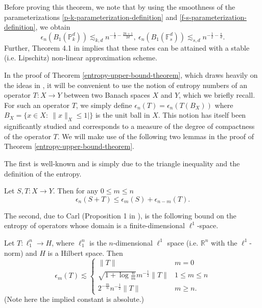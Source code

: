Before proving this theorem, we note that by using the smoothness of the parameterizations \eqref{p-k-parameterization-definition} and \eqref{f-s-parameterization-definition}, we obtain
\begin{equation}
 \epsilon_n(B_1(\mathbb{P}_k^d)) \lesssim_{k,d} n^{-\frac{1}{2} - \frac{2k+1}{2d}},~\epsilon_n(B_1(\mathbb{F}_s^d)) \lesssim_{s,d} n^{-\frac{1}{2} - \frac{s}{d}}.
\end{equation}
Further, Theorem 4.1 in \cite{cohen2020optimal} implies that these rates can be attained with a stable (i.e. Lipschitz) non-linear approximation scheme.

In the proof of Theorem \ref{entropy-upper-bound-theorem}, which draws heavily on the ideas in \cite{ball1990entropy}, it will be convenient to use the notion of entropy numbers of an operator $T:X\rightarrow Y$ between two Banach spaces $X$ and $Y$, which we briefly recall.  For such an operator $T$, we simply define $\epsilon_n(T) = \epsilon_n(T(B_X))$ where $B_X = \{x\in X:~\|x\|_X\leq 1|\}$ is the unit ball in $X$. This notion has itself been significantly studied and corresponds to a measure of the degree of compactness of the operator $T$. We will make use of the following two lemmas in the proof of Theorem \ref{entropy-upper-bound-theorem}.

The first is well-known and is simply due to the triangle inequality and the definition of the entropy.
\begin{lemma}\label{triangle-inequality-entropy-lemma}
 Let $S,T:X\rightarrow Y$. Then for any $0 \leq m\leq n$
 \begin{equation}
  \epsilon_n(S+T) \leq \epsilon_m(S) + \epsilon_{n-m}(T).
 \end{equation}

\end{lemma}

The second, due to Carl (Proposition 1 in \cite{carl1985inequalities}), is the following bound on the entropy of operators whose domain is a finite-dimensional $\ell^1$-space.
\begin{lemma}\label{carls-lemma}
 Let $T:\ell_1^n\rightarrow H$, where $\ell_1^n$ is the $n$-dimensional $\ell^1$ space (i.e. $\mathbb{R}^n$ with the $\ell^1$-norm) and $H$ is a Hilbert space. Then
 \begin{equation}
  \epsilon_m(T) \lesssim \begin{cases} 
         \|T\| & m=0 \\
          \sqrt{1+\log{\frac{n}{m}}}m^{-\frac{1}{2}}\|T\| & 1\leq m\leq n \\
          2^{-\frac{m}{n}}n^{-\frac{1}{2}}\|T\| & m\geq n.
       \end{cases}
 \end{equation}
 (Note here the implied constant is absolute.)

\end{lemma}


